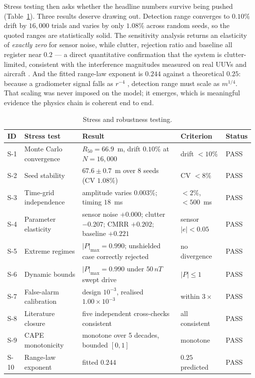 \documentclass[11pt]{article}
\newcommand{\nT}{\,nT}\newcommand{\pT}{\,pT}\newcommand{\fT}{\,fT}
\begin{document}
Stress testing then asks whether the headline numbers survive being pushed
(Table~\ref{tab:stress}). Three results deserve drawing out. Detection range
converges to $0.10\%$ drift by $16{,}000$ trials and varies by only $1.08\%$
across random seeds, so the quoted ranges are statistically solid. The
sensitivity analysis returns an elasticity of \emph{exactly zero} for sensor
noise, while clutter, rejection ratio and baseline all register near $0.2$ --- a
direct quantitative confirmation that the system is clutter-limited, consistent
with the interference magnitudes measured on real UUVs \cite{oehler2024} and
aircraft \cite{gnadt2022}. And the fitted range-law exponent is $0.244$ against a
theoretical $0.25$: because a gradiometer signal falls as $r^{-4}$
\cite{jackson1998,wynn1975}, detection range must scale as $m^{1/4}$. That
scaling was never imposed on the model; it emerges, which is meaningful evidence
the physics chain is coherent end to end.

\begin{table}[htbp]\centering\scriptsize
\begin{tabular}{p{0.8cm}p{3.9cm}p{6.7cm}p{2.6cm}p{1.0cm}}
\toprule
\textbf{ID}&\textbf{Stress test}&\textbf{Result}&\textbf{Criterion}&\textbf{Status}\\
\midrule
S-1&Monte Carlo convergence&$R_{50}=66.9$~m, drift $0.10\%$ at $N{=}16{,}000$&drift $<10\%$&PASS\\
S-2&Seed stability&$67.6\pm0.7$~m over 8 seeds (CV $1.08\%$)&CV $<8\%$&PASS\\
S-3&Time-grid independence&amplitude varies $0.003\%$; timing $18$~ms&$<2\%$, $<500$~ms&PASS\\
S-4&Parameter elasticity&sensor noise $+0.000$; clutter $-0.207$; CMRR $+0.202$; baseline $+0.221$&sensor $|e|<0.05$&PASS\\
S-5&Extreme regimes&$|P|_{\max}=0.990$; unshielded case correctly rejected&no divergence&PASS\\
S-6&Dynamic bounds&$|P|_{\max}=0.990$ under $50\nT$ swept drive&$|P|\leq1$&PASS\\
S-7&False-alarm calibration&design $10^{-3}$, realised $1.00\times10^{-3}$&within $3\times$ \cite{kay1998}&PASS\\
S-8&Literature closure&five independent cross-checks consistent \cite{allred2002,oehler2024,ncei,borna2022}&all consistent&PASS\\
S-9&CAPE monotonicity&monotone over 5 decades, bounded $[0,1]$ \cite{borna2022}&monotone&PASS\\
S-10&Range-law exponent&fitted $0.244$&$0.25$ predicted \cite{jackson1998}&PASS\\
\bottomrule
\end{tabular}
\caption{Stress and robustness testing.}\label{tab:stress}
\end{table}
\end{document}
